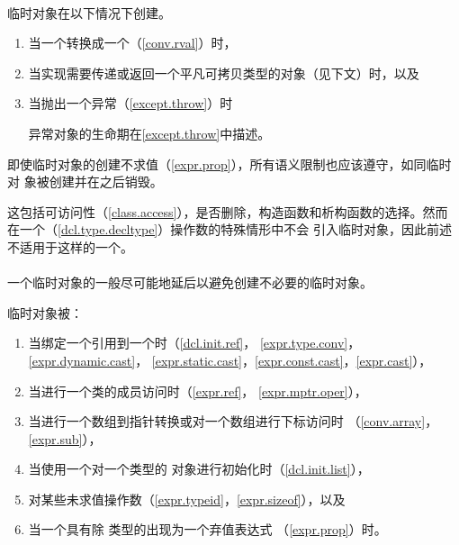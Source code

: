 \paragraph{} %
临时对象在以下情况下创建。
\begin{enumerate}
  \item 当一个\prvalue{}转换成一个\xvalue{}（\ref{conv.rval}）时，
  \item 当实现需要传递或返回一个平凡可拷贝类型的对象（见下文）时，以及
  \item 当抛出一个异常（\ref{except.throw}）时

        \begin{note}
          异常对象的生命期在\ref{except.throw}中描述。
        \end{note}
\end{enumerate}
即使临时对象的创建不求值（\ref{expr.prop}），所有语义限制也应该遵守，如同临时对
象被创建并在之后销毁。

\begin{note}
  这包括可访问性（\ref{class.access}），是否删除，构造函数和析构函数的选择。然而
  在一个（\ref{dcl.type.decltype}）操作数的特殊情形中不会
  引入临时对象，因此前述不适用于这样的一个\prvalue{}。
\end{note}

\paragraph{} %
一个临时对象的\mat{}一般尽可能地延后以避免创建不必要的临时对象。

\begin{note}
  临时对象被\mat{}：
  \begin{enumerate}
    \item 当绑定一个引用到一个\prvalue{}时（\ref{dcl.init.ref}，
          \ref{expr.type.conv}，\ref{expr.dynamic.cast}，
          \ref{expr.static.cast}，\ref{expr.const.cast}，\ref{expr.cast}），
    \item 当进行一个类\prvalue{}的成员访问时（\ref{expr.ref}，
          \ref{expr.mptr.oper}），
    \item 当进行一个数组到指针转换或对一个数组\prvalue{}进行下标访问时
          （\ref{conv.array}，\ref{expr.sub}），
    \item 当使用一个对一个类型的
          对象进行初始化时（\ref{dcl.init.list}），
    \item 对某些未求值操作数（\ref{expr.typeid}，\ref{expr.sizeof}），以及
    \item 当一个具有除 类型的\prvalue{}出现为一个弃值表达式
          （\ref{expr.prop}）时。
  \end{enumerate}
\end{note}

